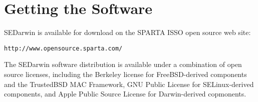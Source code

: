 \section{Getting the Software}

SEDarwin is available for download on the SPARTA ISSO open source web site:

{\tt http://www.opensource.sparta.com/}

The SEDarwin software distribution is available under a combination of open
source licenses, including the Berkeley license for FreeBSD-derived
components and the TrustedBSD MAC Framework, GNU Public License for
SELinux-derived components, and Apple Public Source License for
Darwin-derived copmonents.
